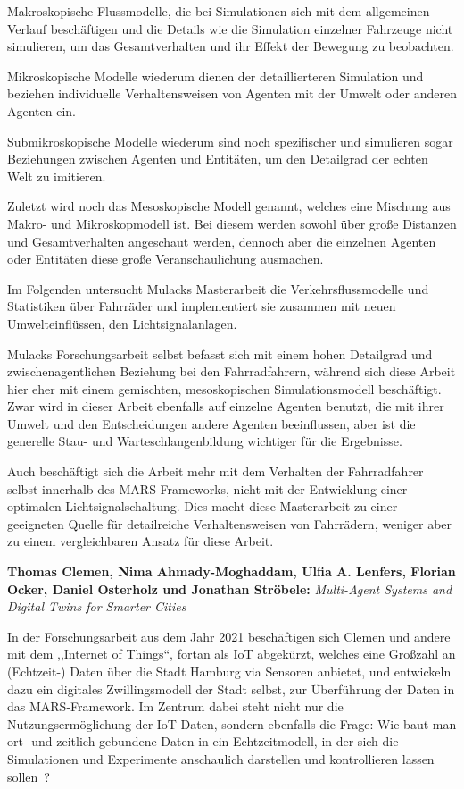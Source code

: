 Makroskopische Flussmodelle, die bei Simulationen sich mit dem allgemeinen Verlauf beschäftigen und die Details wie die Simulation einzelner Fahrzeuge nicht simulieren, um das Gesamtverhalten und ihr Effekt der Bewegung zu beobachten\cite{Mulack2020}.

Mikroskopische Modelle wiederum dienen der detaillierteren Simulation und beziehen individuelle Verhaltensweisen von Agenten mit der Umwelt oder anderen Agenten ein\cite{Mulack2020}.

Submikroskopische Modelle wiederum sind noch spezifischer und simulieren sogar Beziehungen zwischen Agenten und Entitäten, um den Detailgrad der echten Welt zu imitieren\cite{Mulack2020}.

Zuletzt wird noch das Mesoskopische Modell genannt, welches eine Mischung aus Makro- und Mikroskopmodell ist.
Bei diesem werden sowohl über große Distanzen und Gesamtverhalten angeschaut werden, dennoch aber die einzelnen Agenten oder Entitäten diese große Veranschaulichung ausmachen\cite{Mulack2020}.

Im Folgenden untersucht Mulacks Masterarbeit die Verkehrsflussmodelle und Statistiken über Fahrräder und implementiert sie zusammen mit neuen Umwelteinflüssen, den Lichtsignalanlagen.

Mulacks Forschungsarbeit selbst befasst sich mit einem hohen Detailgrad und zwischenagentlichen Beziehung bei den Fahrradfahrern, während sich diese Arbeit hier eher mit einem gemischten, mesoskopischen Simulationsmodell beschäftigt.
Zwar wird in dieser Arbeit ebenfalls auf einzelne Agenten benutzt, die mit ihrer Umwelt und den Entscheidungen andere Agenten beeinflussen, aber ist die generelle Stau- und Warteschlangenbildung wichtiger für die Ergebnisse.

Auch beschäftigt sich die Arbeit mehr mit dem Verhalten der Fahrradfahrer selbst innerhalb des MARS-Frameworks, nicht mit der Entwicklung einer optimalen Lichtsignalschaltung.
Dies macht diese Masterarbeit zu einer geeigneten Quelle für detailreiche Verhaltensweisen von Fahrrädern, weniger aber zu einem vergleichbaren Ansatz für diese Arbeit.


\textbf{Thomas Clemen, Nima Ahmady-Moghaddam, Ulfia A. Lenfers, Florian Ocker, Daniel Osterholz und Jonathan Ströbele:}
\textit{Multi-Agent Systems and Digital Twins for Smarter Cities}

In der Forschungsarbeit aus dem Jahr 2021 beschäftigen sich Clemen und andere mit dem ,,Internet of Things``, fortan als IoT abgekürzt, welches eine Großzahl an (Echtzeit-) Daten über die Stadt Hamburg via Sensoren anbietet, und entwickeln dazu ein digitales Zwillingsmodell der Stadt selbst, zur Überführung der Daten in das MARS-Framework.
Im Zentrum dabei steht nicht nur die Nutzungsermöglichung der IoT-Daten, sondern ebenfalls die Frage: Wie baut man ort- und zeitlich gebundene Daten in ein Echtzeitmodell, in der sich die Simulationen und Experimente anschaulich darstellen und kontrollieren lassen sollen~\cite{Clemen2021}?

